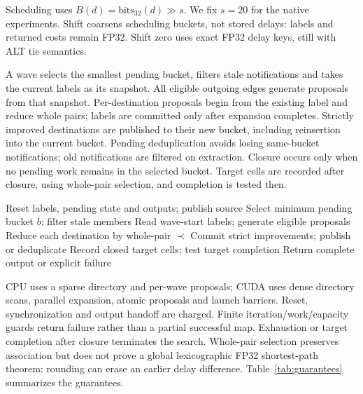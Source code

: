 Scheduling uses $B(d)=\mathrm{bits}_{32}(d)\gg s$. We fix $s=20$ for the native experiments. Shift coarsens scheduling buckets, not stored delays: labels and returned costs remain FP32. Shift zero uses exact FP32 delay keys, still with ALT tie semantics.

A wave selects the smallest pending bucket, filters stale notifications and takes the current labels as its snapshot. All eligible outgoing edges generate proposals from that snapshot. Per-destination proposals begin from the existing label and reduce whole pairs; labels are committed only after expansion completes. Strictly improved destinations are published to their new bucket, including reinsertion into the current bucket. Pending deduplication avoids losing same-bucket notifications; old notifications are filtered on extraction. Closure occurs only when no pending work remains in the selected bucket. Target cells are recorded after closure, using whole-pair selection, and completion is tested then.

\begin{algorithm}[t]\caption{ALT wave contract (one logical sample)}\label{alg:alt}
\begin{algorithmic}[1]
\State Reset labels, pending state and outputs; publish source
\State Select minimum pending bucket $b$; filter stale members
\State Read wave-start labels; generate eligible proposals
\State Reduce each destination by whole-pair $\prec$
\State Commit strict improvements; publish or deduplicate
\State Record closed target cells; test target completion
\EndIf
\EndWhile
\State Return complete output or explicit failure
\end{algorithmic}\end{algorithm}

CPU uses a sparse directory and per-wave proposals; CUDA uses dense directory scans, parallel expansion, atomic proposals and launch barriers. Reset, synchronization and output handoff are charged. Finite iteration/work/capacity guards return failure rather than a partial successful map. Exhaustion or target completion after closure terminates the search. Whole-pair selection preserves association but does not prove a global lexicographic FP32 shortest-path theorem: rounding can erase an earlier delay difference. Table~\ref{tab:guarantees} summarizes the guarantees.

